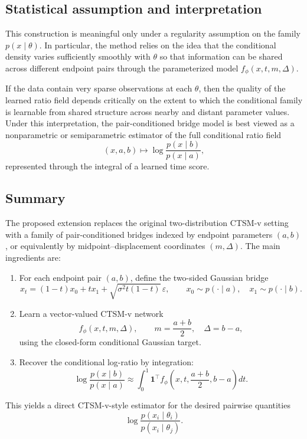 \subsection{Statistical assumption and interpretation}

This construction is meaningful only under a regularity assumption on the family $p(x\mid \theta)$. In particular, the method relies on the idea that the conditional density varies sufficiently smoothly with $\theta$ so that information can be shared across different endpoint pairs through the parameterized model $f_\phi(x,t,m,\Delta)$.

If the data contain very sparse observations at each $\theta$, then the quality of the learned ratio field depends critically on the extent to which the conditional family is learnable from shared structure across nearby and distant parameter values. Under this interpretation, the pair-conditioned bridge model is best viewed as a nonparametric or semiparametric estimator of the full conditional ratio field
\begin{equation}
    (x,a,b) 
    \mapsto
    \log \frac{p(x\mid b)}{p(x\mid a)},
\end{equation}
represented through the integral of a learned time score.

\subsection{Summary}

The proposed extension replaces the original two-distribution CTSM-v setting with a family of pair-conditioned bridges indexed by endpoint parameters $(a,b)$, or equivalently by midpoint--displacement coordinates $(m,\Delta)$. The main ingredients are:
\begin{enumerate}[leftmargin=2em]
    \item For each endpoint pair $(a,b)$, define the two-sided Gaussian bridge
    \begin{equation*}
        x_t = (1-t)x_0 + t x_1 + \sqrt{\sigma^2 t(1-t)}\,\varepsilon,
        \qquad
        x_0 \sim p(\cdot\mid a),
        \quad
        x_1 \sim p(\cdot\mid b).
    \end{equation*}
    \item Learn a vector-valued CTSM-v network
    \begin{equation*}
        f_\phi(x,t,m,\Delta),
        \qquad
        m=\frac{a+b}{2},
        \quad
        \Delta=b-a,
    \end{equation*}
    using the closed-form conditional Gaussian target.
    \item Recover the conditional log-ratio by integration:
    \begin{equation*}
        \log \frac{p(x\mid b)}{p(x\mid a)}
        \approx
        \int_0^1 \mathbf{1}^\top f_\phi\!\left(x,t,\frac{a+b}{2},b-a\right) dt.
    \end{equation*}
\end{enumerate}
This yields a direct CTSM-v-style estimator for the desired pairwise quantities
\begin{equation*}
    \log \frac{p(x_i\mid \theta_i)}{p(x_i\mid \theta_j)}.
\end{equation*}

